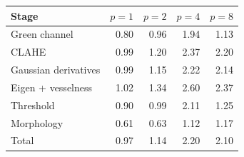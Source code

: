 \begin{tabular}{lrrrr}
\toprule
Stage & $p=1$ & $p=2$ & $p=4$ & $p=8$ \\
\midrule
Green channel & 0.80 & 0.96 & 1.94 & 1.13 \\
CLAHE & 0.99 & 1.20 & 2.37 & 2.20 \\
Gaussian derivatives & 0.99 & 1.15 & 2.22 & 2.14 \\
Eigen + vesselness & 1.02 & 1.34 & 2.60 & 2.37 \\
Threshold & 0.90 & 0.99 & 2.11 & 1.25 \\
Morphology & 0.61 & 0.63 & 1.12 & 1.17 \\
Total & 0.97 & 1.14 & 2.20 & 2.10 \\
\bottomrule
\end{tabular}
